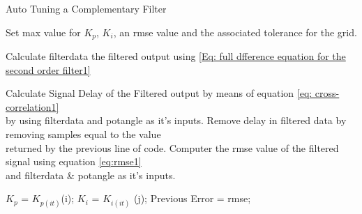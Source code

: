 \begin{algorithm}
	\caption{Auto Tuning a Complementary Filter }\label{Alg: auto tune of comp filter1}
	\begin{algorithmic}[1]
		{	
			\renewcommand{\baselinestretch}{2.5}
			\State Set max value for $K_p$, $K_i$, an \gls{rmse} value and the associated tolerance for the grid.
			
			
			
			 
			
			  
			\vspace{0.2cm}
			
			\State Calculate \gls{filterdata} the  filtered output using  \eqref{Eq: full dfference equation for the second order filter1}
			\vspace{0.2cm}
			
			\State Calculate Signal Delay of the Filtered output by means of equation \eqref{eq: cross-correlation1} \\ \hspace{2.5cm} by using \gls{filterdata} and \gls{potangle} as it's inputs.
			\vspace{0.2cm}
			\State Remove delay in filtered data by removing samples equal to  the value \\ \hspace{2.5cm}  returned by the previous line of code.
			\vspace{0.2cm}
			\State   Computer the \gls{rmse} value of the filtered signal using equation \eqref{eq:rmse1} \\ \hspace{2.5cm} and \gls{filterdata} \& \gls{potangle} as it's inputs.
			
			\State $K_p$ = $K_{p(it)}$(i);
			\State $K_i$ = $K_{i(it)}$ (j);
			\State Previous Error = \gls{rmse};
			\EndIf
			\EndFor
			\EndFor
			
			
			\State {}
			\EndProcedure}
	\end{algorithmic}
\end{algorithm}

